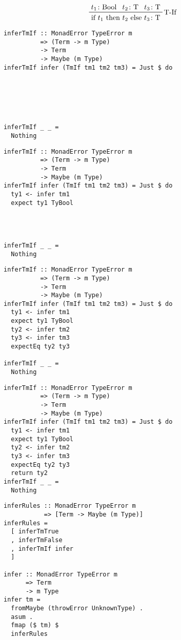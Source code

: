 \documentclass[aspectration=169]{beamer}
\begin{document}
\begin{frame}[fragile]
  \begin{displaymath}
    \prftree[r]{T-If}
    {t_1 \colon \text{Bool}}
    {t_2 \colon \text{T}}
    {t_3 \colon \text{T}}
    {\text{if $t_1$ then $t_2$ else $t_3$} \colon \text{T}}
  \end{displaymath}
  \begin{overprint}
  \begin{verbatim}
inferTmIf :: MonadError TypeError m 
          => (Term -> m Type)
          -> Term 
          -> Maybe (m Type)
inferTmIf infer (TmIf tm1 tm2 tm3) = Just $ do






inferTmIf _ _ =
  Nothing
  \end{verbatim}
  \begin{verbatim}
inferTmIf :: MonadError TypeError m 
          => (Term -> m Type)
          -> Term 
          -> Maybe (m Type)
inferTmIf infer (TmIf tm1 tm2 tm3) = Just $ do
  ty1 <- infer tm1
  expect ty1 TyBool




inferTmIf _ _ =
  Nothing
  \end{verbatim}
  \begin{verbatim}
inferTmIf :: MonadError TypeError m 
          => (Term -> m Type)
          -> Term 
          -> Maybe (m Type)
inferTmIf infer (TmIf tm1 tm2 tm3) = Just $ do
  ty1 <- infer tm1
  expect ty1 TyBool
  ty2 <- infer tm2
  ty3 <- infer tm3
  expectEq ty2 ty3

inferTmIf _ _ =
  Nothing
  \end{verbatim}
  \begin{verbatim}
inferTmIf :: MonadError TypeError m 
          => (Term -> m Type)
          -> Term 
          -> Maybe (m Type)
inferTmIf infer (TmIf tm1 tm2 tm3) = Just $ do
  ty1 <- infer tm1
  expect ty1 TyBool
  ty2 <- infer tm2
  ty3 <- infer tm3
  expectEq ty2 ty3
  return ty2
inferTmIf _ _ =
  Nothing
  \end{verbatim}
  \end{overprint}
\end{frame}

\begin{frame}[fragile]
  \begin{verbatim}
inferRules :: MonadError TypeError m 
           => [Term -> Maybe (m Type)]
inferRules =
  [ inferTmTrue
  , inferTmFalse
  , inferTmIf infer
  ]

infer :: MonadError TypeError m 
      => Term 
      -> m Type
infer tm =
  fromMaybe (throwError UnknownType) .
  asum .
  fmap ($ tm) $
  inferRules
  \end{verbatim}
\end{frame}
\end{document}

